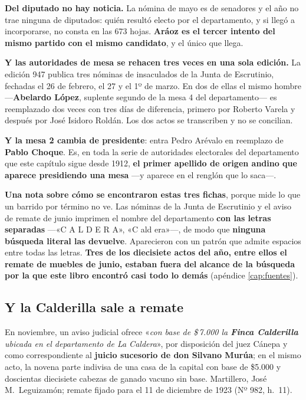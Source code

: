 \begin{cautela}
\textbf{Del diputado no hay noticia.} La nómina de mayo es de senadores y el año no trae ninguna
de diputados: quién resultó electo por el departamento, y si llegó a incorporarse, no consta en
las 673 hojas. \textbf{Aráoz es el tercer intento del mismo partido con el mismo candidato}, y
el único que llega.

\textbf{Y las autoridades de mesa se rehacen tres veces en una sola edición.} La edición 947
publica tres nóminas de insaculados de la Junta de Escrutinio, fechadas el 26 de febrero, el 27
y el 1º de marzo. En dos de ellas el mismo hombre ---\textbf{Abelardo López}, suplente segundo
de la mesa 4 del departamento--- es reemplazado dos veces con tres días de diferencia, primero
por Roberto Varela y después por José Isidoro Roldán. Los dos actos se transcriben y no se
concilian.

\textbf{Y la mesa 2 cambia de presidente}: entra Pedro Arévalo en reemplazo de \textbf{Pablo
Choque}. Es, en toda la serie de autoridades electorales del departamento que este capítulo
sigue desde 1912, \textbf{el primer apellido de origen andino que aparece presidiendo una mesa}
---y aparece en el renglón que lo saca---.
\end{cautela}

\begin{cautela}
\textbf{Una nota sobre cómo se encontraron estas tres fichas}, porque mide lo que un barrido por
término no ve. Las nóminas de la Junta de Escrutinio y el aviso de remate de junio imprimen el
nombre del departamento \textbf{con las letras separadas} ---«C A L D E R A», «C ald era»---, de
modo que \textbf{ninguna búsqueda literal las devuelve}. Aparecieron con un patrón que admite
espacios entre todas las letras. \textbf{Tres de los diecisiete actos del año, entre ellos el remate de
muebles de junio, estaban fuera del alcance de la búsqueda por la que este libro encontró casi todo lo
demás} (apéndice \ref{cap:fuentes}).
\end{cautela}

\subsection*{Y la Calderilla sale a remate}

En noviembre, un aviso judicial ofrece «\textit{con base de \$\,7.000 la \textbf{Finca
Calderilla} ubicada en el departamento de La Caldera}», por disposición del juez Cánepa y como
correspondiente al \textbf{juicio sucesorio de don Silvano Murúa};
en el mismo acto, la novena parte indivisa de una casa de la capital con base de \$5.000 y
doscientas diecisiete cabezas de ganado vacuno sin base. Martillero, José M.\ Leguizamón; remate
fijado para el 11 de diciembre de 1923 (Nº 982, h.\ 11).

